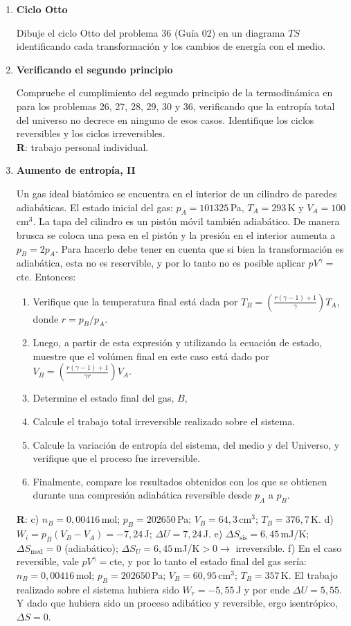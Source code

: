 \documentclass[a4paper,12pt]{article}
\begin{document}
\begin{enumerate}
	\item {\bf{Ciclo Otto}}

		Dibuje el ciclo Otto del problema 36 (Guía 02) en un diagrama $TS$
		identificando cada transformación y los cambios de energía con el
		medio.

	\item {\bf{Verificando el segundo principio}}

		Compruebe el cumplimiento del segundo principio de la termodinámica en
		para los problemas 26, 27, 28, 29, 30 y 36, verificando que la entropía total
		del universo no decrece en ninguno de esos casos. Identifique los
		ciclos reversibles y los ciclos irreversibles.
        \\{\bf{R}}: trabajo personal individual.
		
	\item {\bf{Aumento de entropía, II}}
		
		Un gas ideal biatómico se encuentra en el interior de un cilindro de
		paredes adiabáticas. El estado inicial del gas: $p_A=101325$\,Pa,
		$T_A=293$\,K y $V_A=100$\,cm$^3$. La tapa del cilindro es un pistón
		móvil también adiabático. De manera brusca se coloca una pesa en el
		pistón y la presión en el interior aumenta a $p_B=2 p_A$. Para hacerlo
		debe tener en cuenta que si bien la transformación es adiabática, esta
		no es reservible, y por lo tanto no es posible aplicar
		$pV^{\gamma}=$cte. Entonces:
		\begin{enumerate}
			\item Verifique que la temperatura final está dada por $T_B=\left (
				\frac{r (\gamma-1) + 1}{\gamma}\right ) T_A$, donde $r=p_B/p_A$.
			\item Luego, a partir de esta expresión y utilizando la ecuación de
				estado, muestre que el volúmen final en este caso está dado por
				$V_B=\left ( \frac{r (\gamma-1) + 1}{\gamma r}\right ) V_A$.
			\item Determine el estado final del gas, $B$, 
			\item Calcule el trabajo total irreversible realizado sobre el
				sistema. 
			\item Calcule la variación de entropía del sistema, del medio y del
				Universo, y verifique que el proceso fue irreversible.
			\item Finalmente, compare los resultados obtenidos con los que se
				obtienen durante una compresión adiabática reversible desde
				$p_A$ a $p_B$.
		\end{enumerate}
		{\bf{R}}: 
		c) $n_B=0,00416$\,mol; $p_B=202650$\,Pa; $V_B=64,3$\,cm$^3$; $T_B=376,7$\,K. 
		d) $W_i = p_B (V_B - V_A) = -7,24$\,J; $\Delta U = 7,24$\,J.
		e) $\Delta S_{\mathrm{sis}}=6,45$\,mJ/K; $\Delta S_{\mathrm{med}}=0$
		(adiabático); $\Delta S_U=6,45$\,mJ/K$>0\to$ irreversible.
		f) En el caso reversible, vale $pV^\gamma=$cte, y por lo tanto el
		estado final del gas sería: $n_B=0,00416$\,mol; $p_B=202650$\,Pa;
		$V_B=60,95$\,cm$^3$; $T_B=357$\,K. El trabajo realizado sobre el
		sistema hubiera sido $W_r=-5,55$\,J y por ende $\Delta U=5,55$. Y dado
		que hubiera sido un proceso adibático y reversible, ergo isentrópico,
		$\Delta S=0$.
\end{enumerate}
\end{document}
